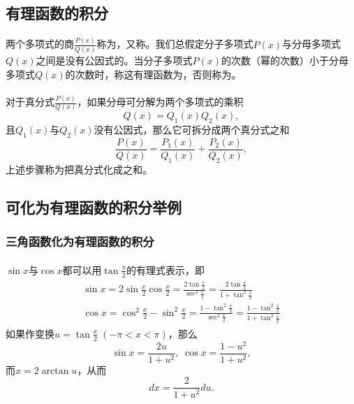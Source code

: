 \subsection{有理函数的积分}
\paragraph{}
两个多项式的商$\displaystyle \frac{P(x)}{Q(x)}$称为，又称。我们总假定分子多项式$P(x)$与分母多项式$Q(x)$之间是没有公因式的。当分子多项式$P(x)$的次数（幂的次数）小于分母多项式$Q(x)$的次数时，称这有理函数为，否则称为。

\paragraph{}
对于真分式$\displaystyle \frac{P(x)}{Q(x)}$，如果分母可分解为两个多项式的乘积
\begin{equation}
  Q(x) = Q_1(x)Q_2(x),
\end{equation}
且$Q_1(x)$与$Q_2(x)$没有公因式，那么它可拆分成两个真分式之和
\begin{equation}
  \frac{P(x)}{Q(x)} = \frac{P_1(x)}{Q_1(x)} + \frac{P_2(x)}{Q_2(x)},
\end{equation}
上述步骤称为把真分式化成之和。

\subsection{可化为有理函数的积分举例}
\subsubsection{三角函数化为有理函数的积分}
\paragraph{}
$\sin{x}$与$\cos{x}$都可以用$\tan\frac{\pi}{2}$的有理式表示，即
\begin{align}
\begin{split}
  \sin{x} = 2\sin\frac{x}{2}\cos\frac{x}{2}
          = \frac{2\tan\frac{x}{2}}{\sec^2\frac{x}{2}}
          = \frac{2\tan\frac{x}{2}}{1+\tan^2\frac{x}{2}} \\
  \cos{x} = \cos^2\frac{x}{2}-\sin^2\frac{x}{2}
          = \frac{1-\tan^2\frac{x}{2}}{\sec^2\frac{x}{2}}
          = \frac{1-\tan^2\frac{x}{2}}{1+\tan^2\frac{x}{2}}
\end{split}
\end{align}
如果作变换$u=\tan\frac{x}{2}\;(-\pi<x<\pi)$，那么
\begin{equation}
  \sin{x}=\frac{2u}{1+u^2}, \; \cos{x} = \frac{1-u^2}{1+u^2},
\end{equation}
而$x=2\arctan{u}$，从而
\begin{equation}
  dx = \frac{2}{1+u^2}du.
\end{equation}

